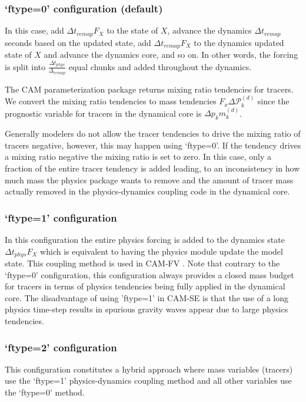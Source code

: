 \documentclass{agujournal}
\begin{document}
{\subsubsection{`ftype=0' configuration (default)}
In this case, add $\Delta t_{remap}F_X$ to the state of $X$, advance the dynamics $\Delta t_{remap}$ seconds based on the updated state, add $\Delta t_{remap}F_X$ {\color{red}{[<-- recompute the physics tendencies first, right?]}} to the dynamics updated state of $X$ and advance the dynamics core, and so on. In other words, the forcing is split into $\frac{\Delta t_{phys}}{\Delta_{remap}}$ equal chunks and added throughout the dynamics. 

The CAM parameterization package returns mixing ratio tendencies for tracers. We convert the mixing ratio tendencies to mass tendencies $F_x \Delta \mathcal{P}^{(d)}_k$ since the prognostic variable for tracers in the dynamical core is $\Delta p_k m^{(d)}_k$.

Generally modelers do not allow the tracer tendencies to drive the mixing ratio of tracers negative, however, this may happen using `ftype=0'. If the tendency drives a mixing ratio negative the mixing ratio is set to zero. In this case, only a fraction of the entire tracer tendency is added leading, to an inconsistency in how much mass the physics package wants to remove and the amount of tracer mass actually removed in the physics-dynamics coupling code in the dynamical core.
\subsubsection{`ftype=1' configuration}
In this configuration the entire physics forcing is added to the dynamics state $\Delta t_{phys}F_X$ which is equivalent to having the physics module update the model state. This coupling method is used in CAM-FV \citep{L2004MWR}. Note that contrary to the `ftype=0' configuration, this configuration always provides a closed mass budget for tracers in terms of physics tendencies being fully applied in the dynamical core. The disadvantage of using 'ftype=1' in CAM-SE is that the use of a long physics time-step results in spurious gravity waves appear due to large physics tendencies.
\subsubsection{`ftype=2' configuration}
This configuration constitutes a hybrid approach where mass variables (tracers) use the `ftype=1' physics-dynamics coupling method and all other variables use the `ftype=0' method.


}
\end{document}

